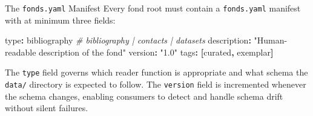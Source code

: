 \documentclass[
  ignorenonframetext,
]{beamer}
\newenvironment{Shaded}{}{}
\newcommand{\AttributeTok}[1]{\textcolor[rgb]{0.49,0.56,0.16}{#1}}
\newcommand{\CommentTok}[1]{\textcolor[rgb]{0.38,0.63,0.69}{\textit{#1}}}
\newcommand{\FunctionTok}[1]{\textcolor[rgb]{0.02,0.16,0.49}{#1}}
\newcommand{\KeywordTok}[1]{\textcolor[rgb]{0.00,0.44,0.13}{\textbf{#1}}}
\newcommand{\StringTok}[1]{\textcolor[rgb]{0.25,0.44,0.63}{#1}}
\begin{document}
\begin{frame}{The \texttt{fonds.yaml}
Manifest}
\protect{}\label{the-fonds.yaml-manifest}
Every fond root must contain a \texttt{fonds.yaml} manifest with at
minimum three fields:

\begin{Shaded}
\begin{Highlighting}[]
\FunctionTok{type}\KeywordTok{:}\AttributeTok{ bibliography}\CommentTok{   \# bibliography | contacts | datasets}
\FunctionTok{description}\KeywordTok{:}\AttributeTok{ }\StringTok{"Human{-}readable description of the fond"}
\FunctionTok{version}\KeywordTok{:}\AttributeTok{ }\StringTok{"1.0"}
\FunctionTok{tags}\KeywordTok{:}\AttributeTok{ }\KeywordTok{[}\AttributeTok{curated}\KeywordTok{,}\AttributeTok{ exemplar}\KeywordTok{]}
\end{Highlighting}
\end{Shaded}

The \texttt{type} field governs which reader function is appropriate and
what schema the \texttt{data/} directory is expected to follow. The
\texttt{version} field is incremented whenever the schema changes,
enabling consumers to detect and handle schema drift without silent
failures.
\end{frame}
\end{document}
